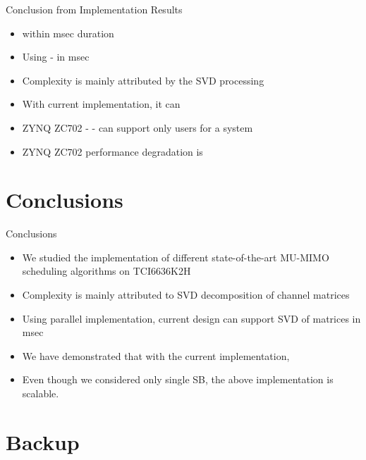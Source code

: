 \documentclass[11pt]{beamer}
\begin{document}
\begin{frame}{Conclusion from Implementation Results}
	\begin{itemize}
		\item {} within  msec duration
		\item Using  -  in  msec 
		\item Complexity is mainly attributed by the SVD processing
		\item With current implementation, it can 
		\item ZYNQ ZC702 -  - can support only  users for a  system
		\item ZYNQ ZC702 performance degradation is 
	\end{itemize}
\end{frame}


\section{Conclusions}

\begin{frame}{Conclusions}
\begin{itemize}
\item We studied the implementation of different state-of-the-art MU-MIMO scheduling algorithms on TCI6636K2H
\item Complexity is mainly attributed to SVD decomposition of channel matrices
\item Using parallel implementation, current design can support  SVD of  matrices in  msec
\item We have demonstrated that with the current implementation, 
\item Even though we considered only single SB, the above implementation is scalable.
\end{itemize}
\end{frame}

\section{Backup}
\end{document}
